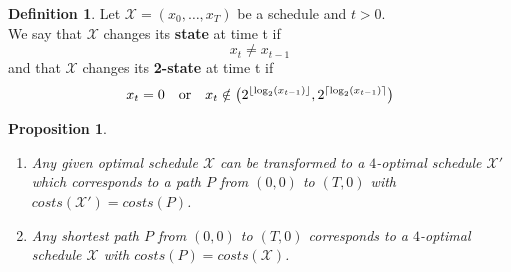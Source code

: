 \documentclass[hidelinks]{article}
\theoremstyle{plain}
\newtheorem{prop}[thm]{Proposition}
\theoremstyle{definition}
\newtheorem{defn}[thm]{Definition}
\theoremstyle{rem}
\newcommand{\mx}{\mathcal{X}}
\begin{document}
\begin{defn}
Let $\mx=(x_0,\ldots,x_T)$ be a schedule and $t>0$.\\
We say that $\mx$ changes its \textbf{state} at time t if
\begin{equation*}
	x_t\neq x_{t-1}
\end{equation*}
and that $\mx$ changes its \textbf{2-state} at time t if
\begin{equation*}
	x_t=0\text{\quad or\quad}x_t\notin\bigl(2^{\lfloor \log_2(x_{t-1})\rfloor},2^{\lceil \log_2(x_{t-1})\rceil}\bigr)
\end{equation*}
\end{defn}
\begin{prop}
$ $
\begin{enumerate}
	\item\label{prop:2opt} Any given optimal schedule $\mx$ can be transformed to a $4$-optimal schedule $\mx'$ which corresponds to a path $P$ from $(0,0)$ to $(T,0)$ with $costs(\mx')=costs(P)$.
	\item Any shortest path $P$ from $(0,0)$ to $(T,0)$ corresponds to a $4$-optimal schedule $\mx$ with $costs(P)=costs(\mx)$.
\end{enumerate}
\end{prop}
\end{document}
